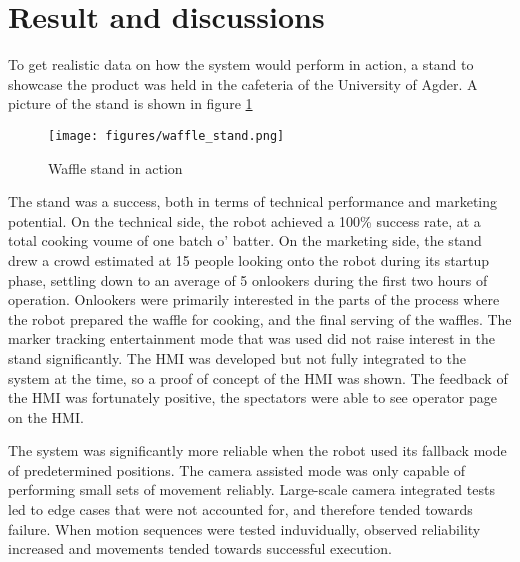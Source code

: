
\section{Result and discussions}
To get realistic data on how the system would perform in action, a stand to showcase the product was held in the cafeteria of the University of Agder. A picture of the stand is shown in figure \ref{fig:bestExample}


\begin{figure}[h]
    \centering
    \texttt{[image: figures/waffle\_stand.png]}
    \caption{Waffle stand in action}
    \label{fig:bestExample}
\end{figure}
The stand was a success, both in terms of technical performance and marketing potential. On the technical side, the robot achieved a 100\% success rate, at a total cooking voume of one batch o' batter. On the marketing side, the stand drew a crowd estimated at 15 people looking onto the robot during its startup phase, settling down to an average of 5 onlookers during the first two hours of operation. Onlookers were primarily interested in the parts of the process where the robot prepared the waffle for cooking, and the final serving of the waffles. The marker tracking entertainment mode that was used did not raise interest in the stand significantly. The HMI was developed but not fully integrated to the system at the time, so a proof of concept of the HMI was shown. The feedback of the HMI was fortunately positive, the spectators were able to see operator page on the HMI.

The system was significantly more reliable when the robot used its fallback mode of predetermined positions. The camera assisted mode was only capable of performing small sets of movement reliably. Large-scale camera integrated tests led to edge cases that were not accounted for, and therefore tended towards failure. When motion sequences were tested induvidually, observed reliability increased and movements tended towards successful execution. 



